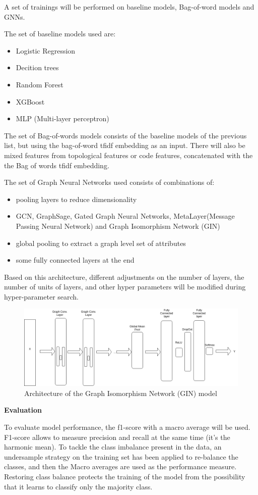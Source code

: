
A set of trainings will be performed on baseline models, Bag-of-word models and GNNs.

The set of baseline models used are:
\begin{itemize}
	\item Logistic Regression
	\item Decition trees
	\item Random Forest
	\item XGBoost
	\item MLP (Multi-layer perceptron)
\end{itemize}

The set of Bag-of-words models consists of the baseline models of the previous list, but using the bag-of-word tfidf embedding as an input. There will also be mixed features from topological features or code features, concatenated with the the Bag of words tfidf embedding.

The set of Graph Neural Networks used consists of combinations of:
\begin{itemize}
	\item pooling layers to reduce dimensionality
	\item GCN, GraphSage, Gated Graph Neural Networks, MetaLayer(Message Passing Neural Network) and Graph Isomorphism Network (GIN)
	\item global pooling to extract a graph level set of attributes
	\item some fully connected layers at the end
\end{itemize}

Based on this architecture, different adjustments on the number of layers, the number of units of layers, and other hyper parameters will be modified during hyper-parameter search.


\begin{figure}[H]
    \centering
        \includegraphics[width=0.85\linewidth]{img/GN_exp2_GIN.png}
    \caption{Architecture of the Graph Isomorphism Network (GIN) model}\label{fig:gin_diagram}
\end{figure}



\textbf{Evaluation}

To evaluate model performance, the f1-score with a macro average will be used. F1-score allows to measure precision and recall at the same time (it's the harmonic mean). To tackle the class imbalance present in the data, an undersample strategy on the training set has been applied to re-balance the classes, and then the Macro averages are used as the performance measure. Restoring class balance protects the training of the model from the possibility that it learns to classify only the majority class.
